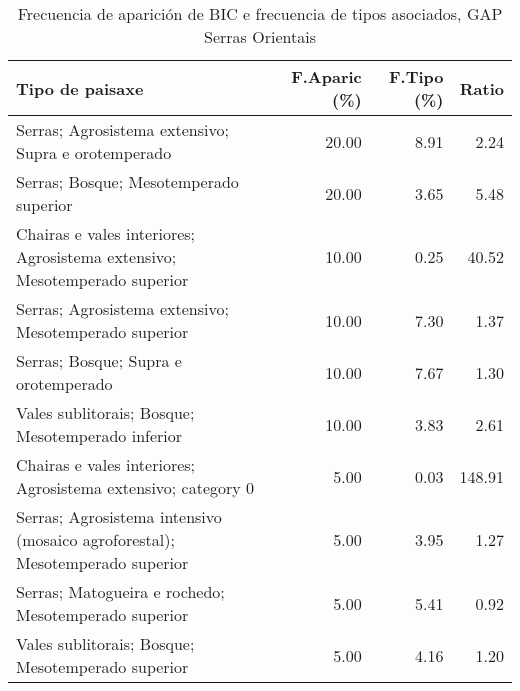 \begin{table}[p]
\centering
\caption{Frecuencia de aparición de BIC e frecuencia de tipos asociados, GAP Serras Orientais} 
\label{vbic5}
\begin{tabular}{lrrr}
  \hline
Tipo de paisaxe & F.Aparic (\%) & F.Tipo (\%) & Ratio \\ 
  \hline
Serras; Agrosistema extensivo; Supra e orotemperado & 20.00 & 8.91 & 2.24 \\ 
  Serras; Bosque; Mesotemperado superior & 20.00 & 3.65 & 5.48 \\ 
  Chairas e vales interiores; Agrosistema extensivo; Mesotemperado superior & 10.00 & 0.25 & 40.52 \\ 
  Serras; Agrosistema extensivo; Mesotemperado superior & 10.00 & 7.30 & 1.37 \\ 
  Serras; Bosque; Supra e orotemperado & 10.00 & 7.67 & 1.30 \\ 
  Vales sublitorais; Bosque; Mesotemperado inferior & 10.00 & 3.83 & 2.61 \\ 
  Chairas e vales interiores; Agrosistema extensivo; category 0 & 5.00 & 0.03 & 148.91 \\ 
  Serras; Agrosistema intensivo (mosaico agroforestal); Mesotemperado superior & 5.00 & 3.95 & 1.27 \\ 
  Serras; Matogueira e rochedo; Mesotemperado superior & 5.00 & 5.41 & 0.92 \\ 
  Vales sublitorais; Bosque; Mesotemperado superior & 5.00 & 4.16 & 1.20 \\ 
   \hline
\end{tabular}
\end{table}
